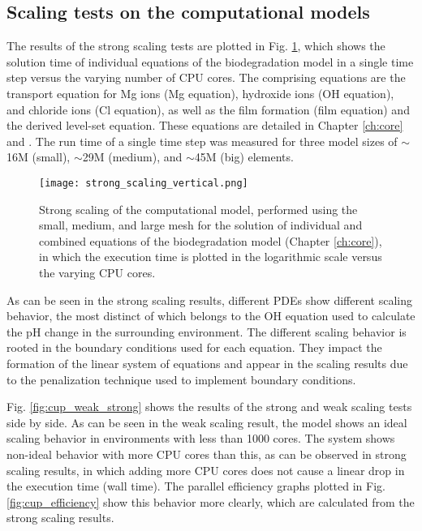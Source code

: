 \subsection{Scaling tests on the computational models}

The results of the strong scaling tests are plotted in Fig. \ref{fig:cup_strong_scaling}, which shows the solution time of individual equations of the biodegradation model in a single time step versus the varying number of {CPU} cores. The comprising equations are the transport equation for Mg ions (Mg equation), hydroxide ions (OH equation), and chloride ions (Cl equation), as well as the film formation (film equation) and the derived level-set equation. These equations are detailed in Chapter \ref{ch:core} and \cite{Barzegari2021}. The run time of a single time step was measured for three model sizes of $\sim$16M (small), $\sim$29M (medium), and $\sim$45M (big) elements.

\begin{figure}[h]
\centering
\medskip
\texttt{[image: strong\_scaling\_vertical.png]}
\caption[Strong scaling of individual and combined components of the biodegradation model]{Strong scaling of the computational model, performed using the small, medium, and large mesh for the solution of individual and combined equations of the biodegradation model (Chapter \ref{ch:core}), in which the execution time is plotted in the logarithmic scale versus the varying {CPU} cores.} \label{fig:cup_strong_scaling}
\end{figure}


As can be seen in the strong scaling results, different {PDE}s show different scaling behavior, the most distinct of which belongs to the OH equation used to calculate the pH change in the surrounding environment. The different scaling behavior is rooted in the boundary conditions used for each equation. They impact the formation of the linear system of equations and appear in the scaling results due to the penalization technique used to implement boundary conditions.

Fig. \ref{fig:cup_weak_strong} shows the results of the strong and weak scaling tests side by side. As can be seen in the weak scaling result, the model shows an ideal scaling behavior in environments with less than \num{1000} cores. The system shows non-ideal behavior with more {CPU} cores than this, as can be observed in strong scaling results, in which adding more {CPU} cores does not cause a linear drop in the execution time (wall time). The parallel efficiency graphs plotted in Fig. \ref{fig:cup_efficiency} show this behavior more clearly, which are calculated from the strong scaling results.


